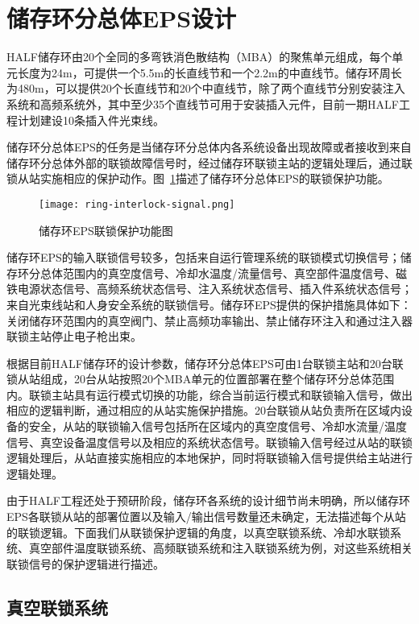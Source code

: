 \section{储存环分总体EPS设计}

HALF储存环由20个全同的多弯铁消色散结构（MBA）的聚焦单元组成，每个单元长度为24m，可提供一个5.5m的长直线节和一个2.2m的中直线节。储存环周长为480m，可以提供20个长直线节和20个中直线节，除了两个直线节分别安装注入系统和高频系统外，其中至少35个直线节可用于安装插入元件，目前一期HALF工程计划建设10条插入件光束线。

储存环分总体EPS的任务是当储存环分总体内各系统设备出现故障或者接收到来自储存环分总体外部的联锁故障信号时，经过储存环联锁主站的逻辑处理后，通过联锁从站实施相应的保护动作。图~\ref{fig:ring-interlock-signal}描述了储存环分总体EPS的联锁保护功能。

\begin{figure}[!htb]
	\centering
	\texttt{[image: ring-interlock-signal.png]}
	\caption{储存环EPS联锁保护功能图}
	\label{fig:ring-interlock-signal}
\end{figure}

储存环EPS的输入联锁信号较多，包括来自运行管理系统的联锁模式切换信号；储存环分总体范围内的真空度信号、冷却水温度/流量信号、真空部件温度信号、磁铁电源状态信号、高频系统状态信号、注入系统状态信号、插入件系统状态信号；来自光束线站和人身安全系统的联锁信号。储存环EPS提供的保护措施具体如下：关闭储存环范围内的真空阀门、禁止高频功率输出、禁止储存环注入和通过注入器联锁主站停止电子枪出束。

根据目前HALF储存环的设计参数，储存环分总体EPS可由1台联锁主站和20台联锁从站组成，20台从站按照20个MBA单元的位置部署在整个储存环分总体范围内。联锁主站具有运行模式切换的功能，综合当前运行模式和联锁输入信号，做出相应的逻辑判断，通过相应的从站实施保护措施。20台联锁从站负责所在区域内设备的安全，从站的联锁输入信号包括所在区域内的真空度信号、冷却水流量/温度信号、真空设备温度信号以及相应的系统状态信号。联锁输入信号经过从站的联锁逻辑处理后，从站直接实施相应的本地保护，同时将联锁输入信号提供给主站进行逻辑处理。

由于HALF工程还处于预研阶段，储存环各系统的设计细节尚未明确，所以储存环EPS各联锁从站的部署位置以及输入/输出信号数量还未确定，无法描述每个从站的联锁逻辑。下面我们从联锁保护逻辑的角度，以真空联锁系统、冷却水联锁系统、真空部件温度联锁系统、高频联锁系统和注入联锁系统为例，对这些系统相关联锁信号的保护逻辑进行描述。

\subsection{真空联锁系统}


